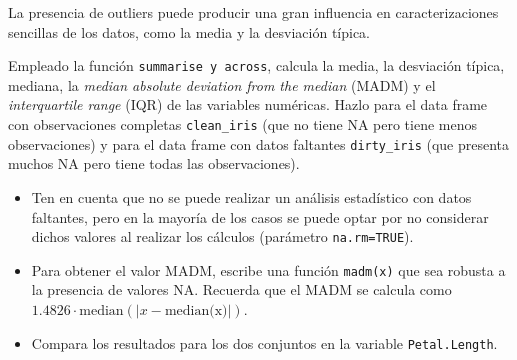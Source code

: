 \documentclass[
]{article}
\providecommand{\tightlist}{%
  \setlength{\itemsep}{0pt}\setlength{\parskip}{0pt}}
\begin{document}
La presencia de outliers puede producir una gran influencia en
caracterizaciones sencillas de los datos, como la media y la desviación
típica.

Empleado la función \texttt{summarise\ y\ across}, calcula la media, la
desviación típica, mediana, la \emph{median absolute deviation from the
median} (MADM) y el \emph{interquartile range} (IQR) de las variables
numéricas. Hazlo para el data frame con observaciones completas
\texttt{clean\_iris} (que no tiene NA pero tiene menos observaciones) y
para el data frame con datos faltantes \texttt{dirty\_iris} (que
presenta muchos NA pero tiene todas las observaciones).

\begin{itemize}
\tightlist
\item
  Ten en cuenta que no se puede realizar un análisis estadístico con
  datos faltantes, pero en la mayoría de los casos se puede optar por no
  considerar dichos valores al realizar los cálculos (parámetro
  \texttt{na.rm=TRUE}).
\item
  Para obtener el valor MADM, escribe una función \texttt{madm(x)} que
  sea robusta a la presencia de valores NA. Recuerda que el MADM se
  calcula como \(1.4826\cdot\textrm{median}(|x - \textrm{median(x)}|)\).
\item
  Compara los resultados para los dos conjuntos en la variable
  \texttt{Petal.Length}.
\end{itemize}
\end{document}
